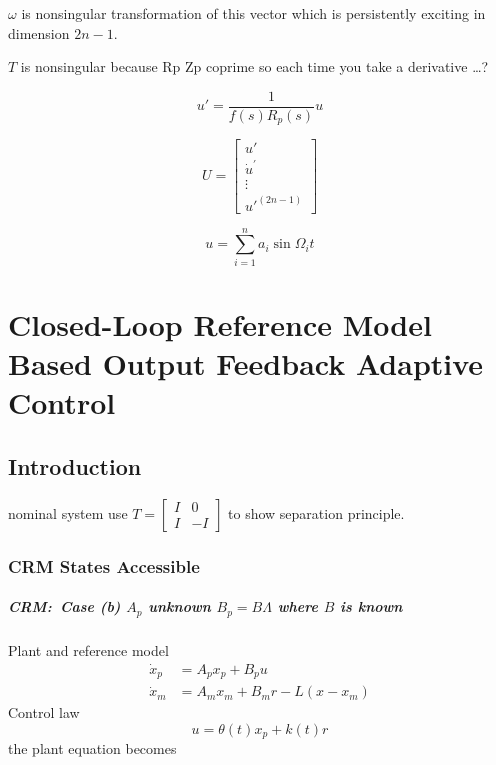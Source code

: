 $\omega$ is nonsingular transformation of this vector which is persistently exciting in dimension $2n-1$.

$T$ is nonsingular because Rp Zp coprime so each time you take a derivative \ldots?

\begin{equation*}
  u'=\frac{1}{f(s)R_{p}(s)}u
\end{equation*}

\begin{equation*}
  U=
  \begin{bmatrix}
    u' \\
    \dot{u}^{\prime} \\
    \vdots \\
    u'^{(2n-1)}
  \end{bmatrix}
\end{equation*}

\begin{equation*}
u=\sum_{i=1}^{n}a_{i}\sin\Omega_{i}t
\end{equation*}


\chapter{Closed-Loop Reference Model Based Output Feedback Adaptive Control}

\section{Introduction}

nominal system use $T=\begin{bmatrix} I & 0 \\ I & -I \end{bmatrix}$ to show separation principle.

\subsection{CRM States Accessible}

\paragraph*{CRM:\ Case (b) $A_{p}$ unknown $B_{p}=B\Lambda$ where $B$ is known}
Plant and reference model
\begin{align*}
  \dot{x}_{p}&=A_{p}x_{p}+B_{p}u \\
  \dot{x}_{m}&=A_{m}x_{m}+B_{m}r-L(x-x_{m})
\end{align*}
Control law
\begin{equation*}
  u=\theta(t)x_{p}+k(t)r
\end{equation*}
the plant equation becomes

